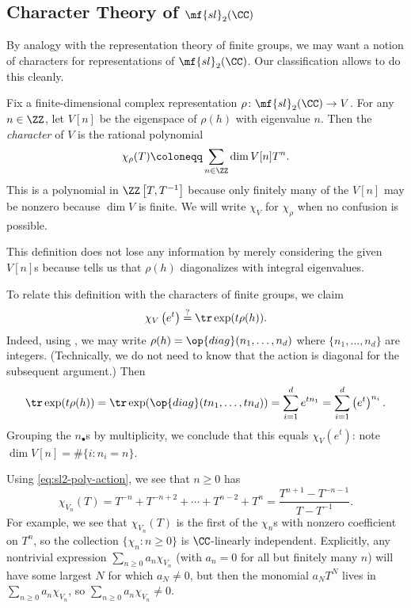 \documentclass[../notes.tex]{subfiles}
\begin{document}
\subsection{Character Theory of \texorpdfstring{$\mf{sl}_2(\CC)$}{sl2(C)}}
By analogy with the representation theory of finite groups, we may want a notion of characters for representations of $\mf{sl}_2(\CC)$. Our classification allows to do this cleanly.
\begin{definition}
	Fix a finite-dimensional complex representation $\rho\colon\mf{sl}_2(\CC)\to V$. For any $n\in\ZZ$, let $V[n]$ be the eigenspace of $\rho(h)$ with eigenvalue $n$. Then the \textit{character} of $V$ is the rational polynomial
	\[\chi_\rho(T)\coloneqq\sum_{n\in\ZZ}\dim V[n]T^n.\]
	This is a polynomial in $\ZZ\left[T,T^{-1}\right]$ because only finitely many of the $V[n]$ may be nonzero because $\dim V$ is finite. We will write $\chi_V$ for $\chi_\rho$ when no confusion is possible.
\end{definition}
\begin{remark}
	This definition does not lose any information by merely considering the given $V[n]$s because  tells us that $\rho(h)$ diagonalizes with integral eigenvalues.
\end{remark}
\begin{remark}
	To relate this definition with the characters of finite groups, we claim
	\[\chi_V\left(e^t\right)\stackrel?=\tr\exp(t\rho(h)).\]
	Indeed, using , we may write $\rho(h)=\op{diag}(n_1,\ldots,n_d)$ where $\{n_1,\ldots,n_d\}$ are integers. (Technically, we do not need to know that the action is diagonal for the subsequent argument.) Then
	\[\tr\exp(t\rho(h)) = \tr\exp(\op{diag}(tn_1,\ldots,tn_d))=\sum_{i=1}^de^{tn_1}=\sum_{i=1}^d\left(e^t\right)^{n_i}.\]
	Grouping the $n_\bullet$s by multiplicity, we conclude that this equals $\chi_V\left(e^t\right)$: note $\dim V[n]=\#\{i:n_i=n\}$.
\end{remark}
\begin{example} \label{ex:sl2-poly-chars}
	Using \eqref{eq:sl2-poly-action}, we see that $n\ge0$ has
	\[\chi_{V_n}(T)=T^{-n}+T^{-n+2}+\cdots+T^{n-2}+T^n=\frac{T^{n+1}-T^{-n-1}}{T-T^{-1}}.\]
	For example, we see that $\chi_{V_n}(T)$ is the first of the $\chi_n$s with nonzero coefficient on $T^n$, so the collection $\{\chi_n:n\ge0\}$ is $\CC$-linearly independent. Explicitly, any nontrivial expression $\sum_{n\ge0}a_n\chi_{V_n}$ (with $a_n=0$ for all but finitely many $n$) will have some largest $N$ for which $a_N\ne 0$, but then the monomial $a_NT^N$ lives in $\sum_{n\ge0}a_n\chi_{V_n}$, so $\sum_{n\ge0}a_n\chi_{V_n}\ne0$.
\end{example}
\end{document}
